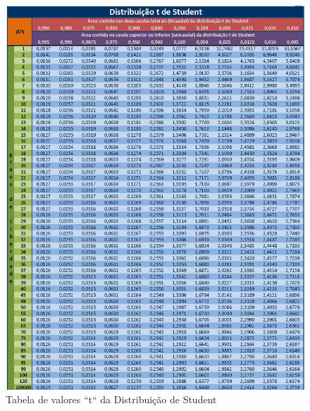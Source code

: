 \documentclass[
]{book}
\begin{document}
\begin{figure}

{\centering \includegraphics[width=1\linewidth]{images6/tabt} 

}

\caption{Tabela de valores ``t`` da Distribuição de Student}\label{fig:fig31}
\end{figure}

\hfill\break
\end{document}
